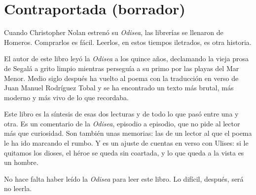 \documentclass[12pt,a4paper]{article}
\begin{document}
\section*{Contraportada (borrador)}

Cuando Christopher Nolan estrenó su \emph{Odisea}, las librerías se llenaron de Homeros. Comprarlos es fácil. Leerlos, en estos tiempos iletrados, es otra historia.

El autor de este libro leyó la \emph{Odisea} a los quince años, declamando la vieja prosa de Segalá a grito limpio mientras perseguía a su primo por las playas del Mar Menor. Medio siglo después ha vuelto al poema con la traducción en verso de Juan Manuel Rodríguez Tobal y se ha encontrado un texto más brutal, más moderno y más vivo de lo que recordaba.

Este libro es la síntesis de esas dos lecturas y de todo lo que pasó entre una y otra. Es un comentario de la \emph{Odisea}, episodio a episodio, que no pide al lector más que curiosidad. Son también unas memorias: las de un lector al que el poema le ha ido marcando el rumbo. Y es un ajuste de cuentas en verso con Ulises: si le quitamos los dioses, el héroe se queda sin coartada, y lo que queda a la vista es un hombre.

No hace falta haber leído la \emph{Odisea} para leer este libro. Lo difícil, después, será no leerla.
\end{document}
